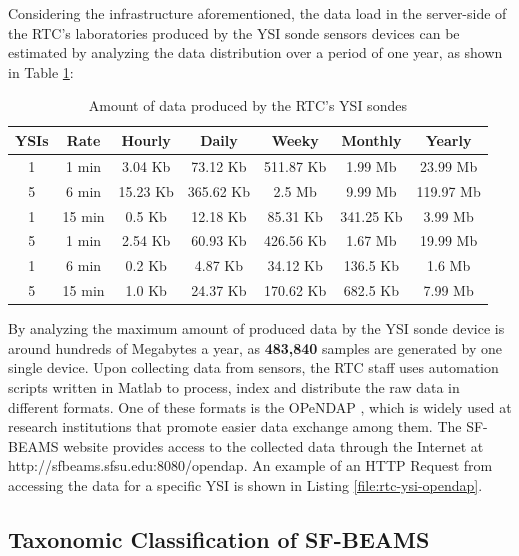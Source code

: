 Considering the infrastructure aforementioned, the data load in the server-side
of the RTC's laboratories produced by the YSI sonde sensors devices can be
estimated by analyzing the data distribution over a period of one year, as
shown in Table \ref{tab:ysi-data-distribution}:

\begin{table}[!b]
    \label{tab:ysi-data-distribution}
    \caption{Amount of data produced by the RTC's YSI sondes}
        \begin{center}
        \begin{tabular}{|c|c|c|c|c|c|c|}\hline 
        \textbf{YSIs} & \textbf{Rate} & \textbf{Hourly} & \textbf{Daily} &
        \textbf{Weeky} & \textbf{Monthly} & \textbf{Yearly}\\\hline 
        1 & 1 min & 3.04 Kb & 73.12 Kb & 511.87 Kb & 1.99 Mb & 23.99 Mb\\\hline 
        5 & 6 min & 15.23 Kb & 365.62 Kb & 2.5 Mb & 9.99 Mb & 119.97 Mb\\\hline 
        1 & 15 min & 0.5 Kb & 12.18 Kb & 85.31 Kb & 341.25 Kb & 3.99 Mb\\\hline 
        5 & 1 min & 2.54 Kb & 60.93 Kb & 426.56 Kb & 1.67 Mb & 19.99 Mb\\\hline
        1 & 6 min & 0.2 Kb & 4.87 Kb & 34.12 Kb & 136.5 Kb & 1.6 Mb\\\hline 
        5 & 15 min & 1.0 Kb & 24.37 Kb & 170.62 Kb & 682.5 Kb & 7.99 Mb\\\hline
        \end{tabular}
        \end{center}
\end{table}

By analyzing the maximum amount of produced data by the YSI sonde device is
around hundreds of Megabytes a year, as \textbf{483,840} samples are generated
by one single device. Upon collecting data from sensors, the RTC staff uses
automation scripts written in Matlab \cite{matlab} to process, index and
distribute the raw data in different formats. One of these formats is the
OPeNDAP \cite{opendap}, which is widely used at research institutions that
promote easier data exchange among them. The SF-BEAMS website provides access
to the collected data through the Internet at
http://sfbeams.sfsu.edu:8080/opendap. An example of an HTTP Request from
accessing the data for a specific YSI is shown in Listing
\ref{file:rtc-ysi-opendap}.

\subsection{Taxonomic Classification of SF-BEAMS}

